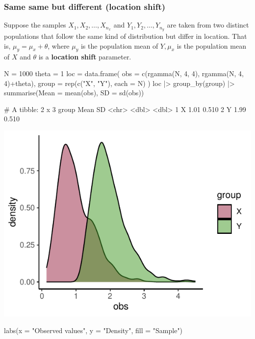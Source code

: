 \documentclass[a4paper]{article}
\begin{document}
\subsubsection{Same same but different (location shift)}
Suppose the samples \( X_1,X_2,\dots,X_{n_x} \) and \( Y_1,Y_2,\dotsc,Y_{n_y} \) are taken from two distinct populations that follow the same kind of distribution but differ in location.
That is, \( \mu_y = \mu_x + \theta \), where \( \mu_y \) is the population mean of \( Y, \mu_x \) is the population mean of \( X \) and \( \theta \) is a \textcolor{mygreen}{\textbf{location shift}} parameter.
\begin{Schunk}
\begin{Sinput}
N = 1000
theta = 1
loc = data.frame(
obs = c(rgamma(N, 4, 4),
				rgamma(N, 4, 4)+theta),
group = rep(c("X", "Y"), each = N)
)
loc |> group_by(group) |> 
	   summarise(Mean = mean(obs),
       SD = sd(obs))
\end{Sinput}
\begin{Soutput}
# A tibble: 2 x 3
  group  Mean    SD
  <chr> <dbl> <dbl>
1 X      1.01 0.510
2 Y      1.99 0.510
\end{Soutput}
\end{Schunk}
\begin{Schunk}


{\centering \includegraphics[width=\maxwidth]{figure/listings-unnamed-chunk-118-1} 

}

\begin{Sinput}
labs(x = "Observed values", 
	 y = "Density", 
   	 fill = "Sample")
\end{Sinput}
\end{Schunk}
\end{document}

